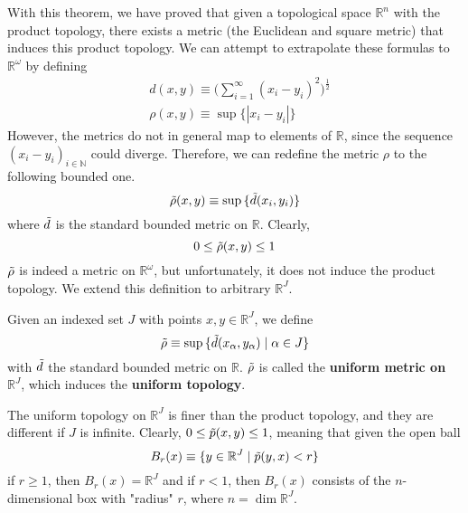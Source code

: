   With this theorem, we have proved that given a topological space $\mathbb{R}^n$ with the product topology, there exists a metric (the Euclidean and square metric) that induces this product topology. We can attempt to extrapolate these formulas to $\mathbb{R}^\omega$ by defining
  \begin{align*}
    & d(x, y) \equiv \bigg(\sum_{i=1}^\infty (x_i - y_i)^2 \bigg)^{\frac{1}{2}} \\
    & \rho(x, y) \equiv \sup{\{|x_i - y_i|\}}
  \end{align*}
  However, the metrics do not in general map to elements of $\mathbb{R}$, since the sequence $(x_i - y_i)_{i \in \mathbb{N}}$ could diverge. Therefore, we can redefine the metric $\rho$ to the following bounded one. 
  \begin{equation}
    \Tilde{\rho} (x, y) \equiv \sup{\{\Tilde{d}(x_i, y_i)\}}
  \end{equation}
  where $\Tilde{d}$ is the standard bounded metric on $\mathbb{R}$. Clearly,
  \begin{equation}
    0 \leq \Tilde{\rho}(x, y) \leq 1
  \end{equation}
  $\Tilde{\rho}$ is indeed a metric on $\mathbb{R}^\omega$, but unfortunately, it does not induce the product topology. We extend this definition to arbitrary $\mathbb{R}^J$. 
  
  \begin{definition}
    Given an indexed set $J$ with points $x, y \in \mathbb{R}^J$, we define
    \begin{equation}
      \Tilde{\rho} \equiv \sup{\{\Tilde{d}(x_\alpha, y_\alpha)\;|\; \alpha \in J\}}
    \end{equation}
    with $\Tilde{d}$ the standard bounded metric on $\mathbb{R}$. $\Tilde{\rho}$ is called the \textbf{uniform metric on $\mathbb{R}^J$}, which induces the \textbf{uniform topology}. 
  \end{definition}

  The uniform topology on $\mathbb{R}^J$ is finer than the product topology, and they are different if $J$ is infinite. Clearly, $0 \leq \Tilde{p} (x, y) \leq 1$, meaning that given the open ball
  \begin{equation}
    B_r (x) \equiv \{y \in \mathbb{R}^J \;|\; \Tilde{p}(y, x) < r\}
  \end{equation}
  if $r \geq 1$, then $B_r (x) = \mathbb{R}^J$ and if $r<1$, then $B_r (x)$ consists of the $n$-dimensional box with "radius" $r$, where $n = \dim{\mathbb{R}^J}$. 


